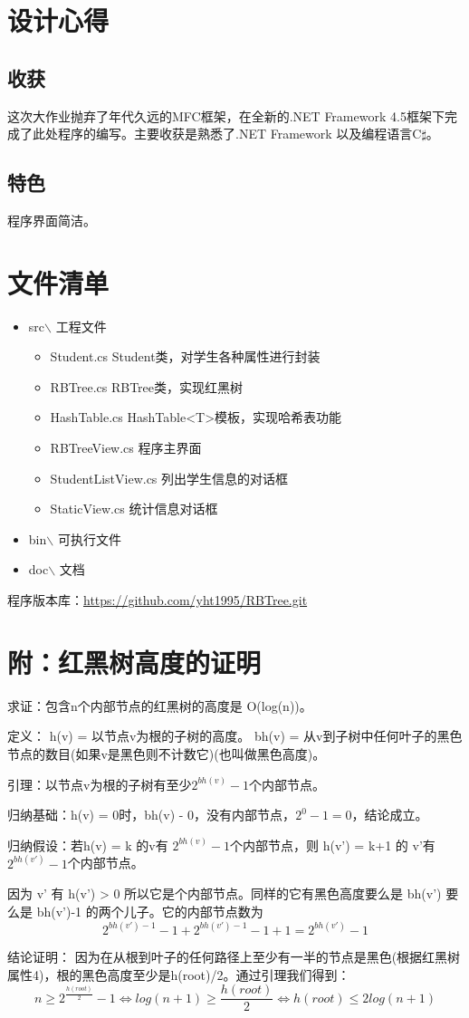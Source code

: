 \documentclass[12pt,a4paper]{article}
\begin{document}
\section{设计心得}
\subsection{收获}
这次大作业抛弃了年代久远的MFC框架，在全新的.NET Framework 4.5框架下完成了此处程序的编写。主要收获是熟悉了.NET Framework 以及编程语言C$\sharp$。
\subsection{特色}
程序界面简洁。
\section{文件清单}
\begin{itemize}
\item src$\backslash$ 工程文件
\begin{itemize}
\item Student.cs Student类，对学生各种属性进行封装
\item RBTree.cs RBTree类，实现红黑树
\item HashTable.cs HashTable<T>模板，实现哈希表功能
\item RBTreeView.cs 程序主界面
\item StudentListView.cs 列出学生信息的对话框
\item StaticView.cs 统计信息对话框
\end{itemize}
\item bin$\backslash$ 可执行文件
\item doc$\backslash$ 文档
\end{itemize}
程序版本库：\url{https://github.com/yht1995/RBTree.git}

\section{附：红黑树高度的证明}
求证：包含n个内部节点的红黑树的高度是 O(log(n))。\par
定义：
h(v) = 以节点v为根的子树的高度。
bh(v) = 从v到子树中任何叶子的黑色节点的数目(如果v是黑色则不计数它)(也叫做黑色高度)。\par
引理：以节点v为根的子树有至少$2^{bh(v) }− 1$个内部节点。\par
归纳基础：h(v) = 0时，bh(v) - 0，没有内部节点，$2^0-1=0$，结论成立。\par
归纳假设：若h(v) = k 的v有 $2^{bh(v)} − 1 $个内部节点，则 h(v') = k+1 的 v'有$2^{bh(v')}− 1 $个内部节点。\par
因为 v' 有 h(v') > 0 所以它是个内部节点。同样的它有黑色高度要么是 bh(v') 要么是 bh(v')-1 的两个儿子。它的内部节点数为
\[2^{bh(v') − 1} − 1 + 2^{bh(v') − 1} − 1 + 1 = 2^{bh(v')} − 1\]\par
结论证明：
因为在从根到叶子的任何路径上至少有一半的节点是黑色(根据红黑树属性4)，根的黑色高度至少是h(root)/2。通过引理我们得到：
\[
n\geq 2^{\frac{h(root)}{2}}-1 \Leftrightarrow log(n+1) \geq \frac{h(root)}{2} \Leftrightarrow h(root)\leq 2log(n+1)
\]
\end{document}
